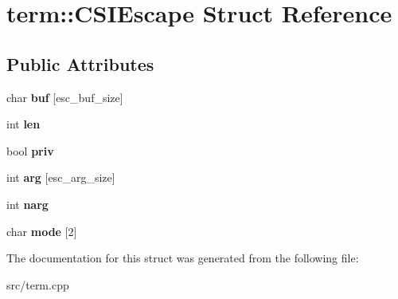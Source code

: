 \hypertarget{structterm_1_1CSIEscape}{}\section{term\+::C\+S\+I\+Escape Struct Reference}
\label{structterm_1_1CSIEscape}
\subsection*{Public Attributes}
\begin{DoxyCompactItemize}
\item 
\mbox{\label{structterm_1_1CSIEscape_acb6ce271a208c0b516424c60b13bff7c}} 
char {\bfseries buf} \mbox{[}esc\+\_\+buf\+\_\+size\mbox{]}
\item 
\mbox{\label{structterm_1_1CSIEscape_aebd33a3652564a712b16ba55bbc7fe6c}} 
int {\bfseries len}
\item 
\mbox{\label{structterm_1_1CSIEscape_aec243562058c05710e46adb45489c96f}} 
bool {\bfseries priv}
\item 
\mbox{\label{structterm_1_1CSIEscape_ab2a9851e9ae769ddc497a1bb3021767c}} 
int {\bfseries arg} \mbox{[}esc\+\_\+arg\+\_\+size\mbox{]}
\item 
\mbox{\label{structterm_1_1CSIEscape_a96f1abfe79e57ae7b263f21c5632fc3c}} 
int {\bfseries narg}
\item 
\mbox{\label{structterm_1_1CSIEscape_ae4a4b81807ee2bd9e29ed82f4e1bfb4b}} 
char {\bfseries mode} \mbox{[}2\mbox{]}
\end{DoxyCompactItemize}


The documentation for this struct was generated from the following file\+:\begin{DoxyCompactItemize}
\item 
src/term.\+cpp\end{DoxyCompactItemize}
